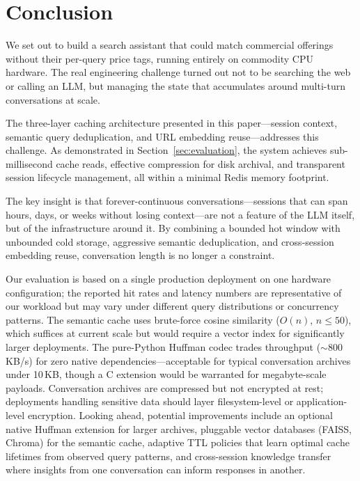 \documentclass[conference]{IEEEtran}
\begin{document}
\section{Conclusion}
\label{sec:conclusion}

We set out to build a search assistant that could match commercial offerings without their per-query price tags, running entirely on commodity CPU hardware. The real engineering challenge turned out not to be searching the web or calling an LLM, but managing the state that accumulates around multi-turn conversations at scale.

The three-layer caching architecture presented in this paper---session context, semantic query deduplication, and URL embedding reuse---addresses this challenge. As demonstrated in Section~\ref{sec:evaluation}, the system achieves sub-millisecond cache reads, effective compression for disk archival, and transparent session lifecycle management, all within a minimal Redis memory footprint.

The key insight is that forever-continuous conversations---sessions that can span hours, days, or weeks without losing context---are not a feature of the LLM itself, but of the infrastructure around it. By combining a bounded hot window with unbounded cold storage, aggressive semantic deduplication, and cross-session embedding reuse, conversation length is no longer a constraint.

Our evaluation is based on a single production deployment on one hardware configuration; the reported hit rates and latency numbers are representative of our workload but may vary under different query distributions or concurrency patterns. The semantic cache uses brute-force cosine similarity ($O(n)$, $n \leq 50$), which suffices at current scale but would require a vector index for significantly larger deployments. The pure-Python Huffman codec trades throughput (${\sim}$800\,KB/s) for zero native dependencies---acceptable for typical conversation archives under 10\,KB, though a C extension would be warranted for megabyte-scale payloads. Conversation archives are compressed but not encrypted at rest; deployments handling sensitive data should layer filesystem-level or application-level encryption. Looking ahead, potential improvements include an optional native Huffman extension for larger archives, pluggable vector databases (FAISS, Chroma) for the semantic cache, adaptive TTL policies that learn optimal cache lifetimes from observed query patterns, and cross-session knowledge transfer where insights from one conversation can inform responses in another.





\end{document}
